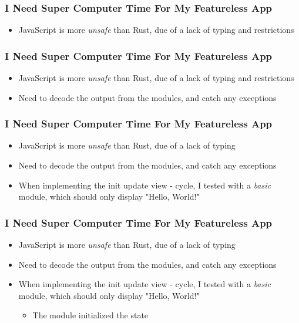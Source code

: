 \begin{frame}
  \frametitle{I Need Super Computer Time For My Featureless App}
  \begin{itemize}
    \item JavaScript is more \textit{unsafe} than Rust, due of a lack of typing
      and restrictions
  \end{itemize}
\end{frame}

\begin{frame}
  \frametitle{I Need Super Computer Time For My Featureless App}
  \begin{itemize}
    \item JavaScript is more \textit{unsafe} than Rust, due of a lack of typing
      and restrictions
    \item Need to decode the output from the modules, and catch any exceptions
  \end{itemize}
\end{frame}

\begin{frame}
  \frametitle{I Need Super Computer Time For My Featureless App}
  \begin{itemize}
    \item JavaScript is more \textit{unsafe} than Rust, due of a lack of typing
    \item Need to decode the output from the modules, and catch any exceptions
    \item When implementing the init \to update \to view - cycle, I tested with
      a \textit{basic} module, which should only display "Hello, World!"
  \end{itemize}
\end{frame}

\begin{frame}
  \frametitle{I Need Super Computer Time For My Featureless App}
  \begin{itemize}
    \item JavaScript is more \textit{unsafe} than Rust, due of a lack of typing
    \item Need to decode the output from the modules, and catch any exceptions
    \item When implementing the init \to update \to view - cycle, I tested with
      a \textit{basic} module, which should only display "Hello, World!"
      \begin{itemize}
        \item The module initialized the state
      \end{itemize}
  \end{itemize}
\end{frame}


